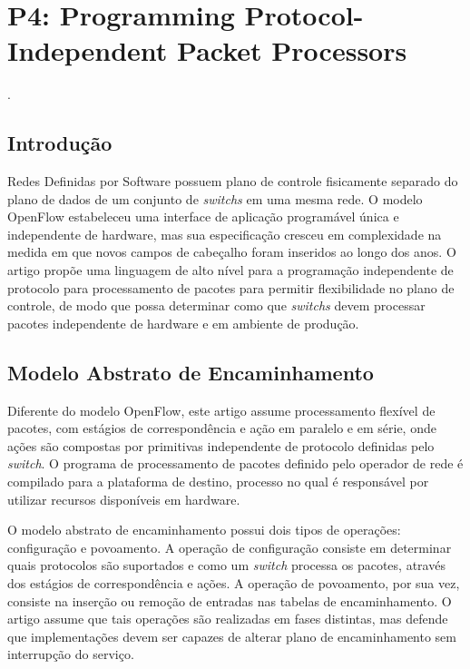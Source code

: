 
\chapter{P4: Programming Protocol-Independent Packet Processors}
 \cite{bosshart2014p4}.


\section*{Introdução}

Redes Definidas por Software possuem plano de controle fisicamente separado do plano de dados de um conjunto de \textit{switchs} em uma mesma rede. O modelo OpenFlow estabeleceu uma interface de aplicação programável única e independente de hardware, mas sua especificação cresceu em complexidade na medida em que novos campos de cabeçalho foram inseridos ao longo dos anos. O artigo propõe uma linguagem de alto nível para a programação independente de protocolo para processamento de pacotes para permitir flexibilidade no plano de controle, de modo que possa determinar como que \textit{switchs} devem processar pacotes independente de hardware e em ambiente de produção.


\section*{Modelo Abstrato de Encaminhamento}

Diferente do modelo OpenFlow, este artigo assume processamento flexível de pacotes, com estágios de correspondência e ação em paralelo e em série, onde ações são compostas por primitivas independente de protocolo definidas pelo \textit{switch}. O programa de processamento de pacotes definido pelo operador de rede é compilado para a plataforma de destino, processo no qual é responsável por utilizar recursos disponíveis em hardware.

O modelo abstrato de encaminhamento possui dois tipos de operações: configuração e povoamento. A operação de configuração consiste em determinar quais protocolos são suportados e como um \textit{switch} processa os pacotes, através dos estágios de correspondência e ações. A operação de povoamento, por sua vez, consiste na inserção ou remoção de entradas nas tabelas de encaminhamento. O artigo assume que tais operações são realizadas em fases distintas, mas defende que implementações devem ser capazes de alterar plano de encaminhamento sem interrupção do serviço.

